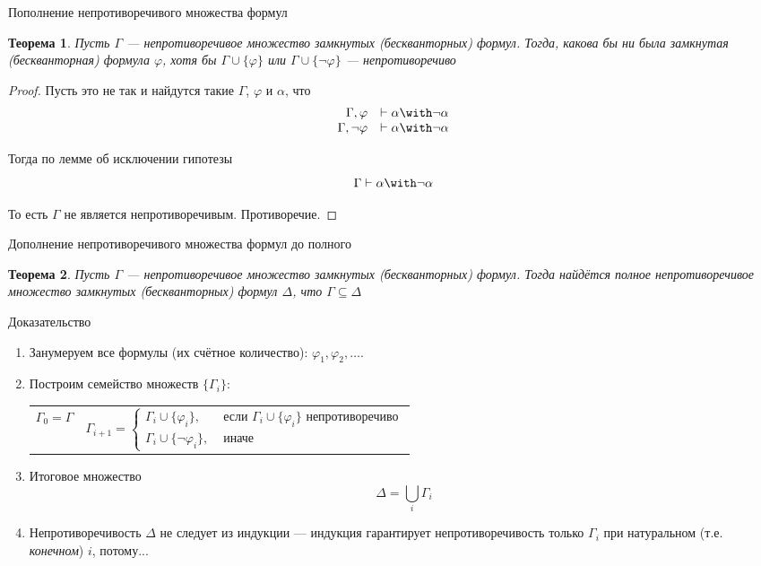 \documentclass[aspectratio=169]{beamer}
\newtheorem{thm}{Теорема}[section]
\begin{document}
\begin{frame}{Пополнение непротиворечивого множества формул}
\begin{thm}Пусть $\Gamma$ --- непротиворечивое множество замкнутых (бескванторных) формул. Тогда, какова бы ни была
замкнутая (бескванторная) формула $\varphi$, хотя бы $\Gamma \cup \{\varphi\}$ или $\Gamma \cup \{\neg\varphi\}$ ---
непротиворечиво\end{thm}\pause

\begin{proof}
Пусть это не так и найдутся такие $\Gamma$, $\varphi$ и $\alpha$, что
 $$\begin{array}{rl}\Gamma,\varphi & \vdash \alpha\with\neg\alpha\\
                    \Gamma,\neg\varphi & \vdash \alpha \with\neg\alpha\end{array}$$\pause\vspace{-0.3cm}

Тогда по лемме об исключении гипотезы
$$\Gamma\vdash \alpha\with\neg\alpha$$\pause\vspace{-0.4cm}

То есть $\Gamma$ не является непротиворечивым. Противоречие.
\end{proof}
\end{frame}

\begin{frame}{Дополнение непротиворечивого множества формул до полного}
\begin{thm}Пусть $\Gamma$ --- непротиворечивое множество замкнутых (бескванторных) формул. Тогда
найдётся полное непротиворечивое множество замкнутых (бескванторных) формул $\Delta$, что
$\Gamma \subseteq \Delta$
\end{thm}\pause

\begin{block}{Доказательство}
\begin{enumerate}
\item Занумеруем все формулы (их счётное количество): $\varphi_1, \varphi_2, \dots$.\pause
\item Построим семейство множеств $\{\Gamma_i\}$:
\begin{tabular}{cc}
$\Gamma_0 = \Gamma$  &
\begin{minipage}{12cm}
$$\Gamma_{i+1} = \left\{\begin{array}{ll}\Gamma_i \cup \{\varphi_i\},& \mbox{ если } \Gamma_i \cup \{\varphi_i\} \mbox{ непротиворечиво}\\
                                               \Gamma_i \cup \{\neg\varphi_i\},& \mbox{ иначе}\end{array}\right.$$
\end{minipage}\end{tabular}\pause
\item Итоговое множество $$\Delta = \bigcup_i \Gamma_i$$\pause\vspace{-0.2cm}
\item Непротиворечивость $\Delta$ не следует из индукции --- индукция гарантирует непротиворечивость
      только $\Gamma_i$ при натуральном (т.е. \emph{конечном}) $i$, потому...
\end{enumerate}
\end{block}
\end{frame}
\end{document}

